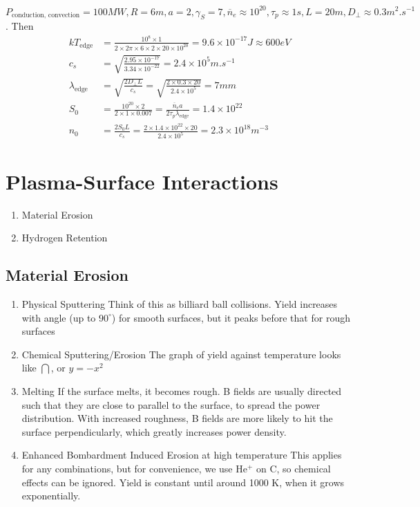 \documentclass[12pt]{article}
\begin{document}
\begin{ex}[ITER]
    $P_{\text{conduction, convection}} = 100\unit{MW}, R = 6\unit{m}, a = 2, \gamma_S = 7, \overline n_e \approx 10^{20}, \tau_p \approx 1\unit{s}, L = 20\unit{m}, D_\perp \approx 0.3 \unit{m^2.s^{-1}}$. Then
    \begin{align*}
        kT_{\text{edge}} &= \frac{10^8\times1}{2\times2\pi\times6\times2\times20\times10^{20}} = 9.6 \times 10^{-17}\unit{J} \approx 600 \unit{eV} \\
        c_s &= \sqrt{\frac{2.95\times10^{-17}}{3.34 \times 10^{-22}}} = 2.4 \times 10^5 \unit{m.s^{-1}} \\
        \lambda_{\text{edge}} &= \sqrt{\frac{2D_\perp L}{c_s}} = \sqrt{\frac{2\times0.3\times20}{2.4\times10^5}} = 7\unit{mm} \\
        S_0 &= \frac{10^{20}\times2}{2\times1\times0.007} = \frac{\overline n_ea}{2\tau_p\lambda_{\text{edge}}} = 1.4 \times 10^{22} \\
        n_0 &= \frac{2S_0L}{c_s} = \frac{2\times 1.4\times10^{22}\times20}{2.4\times10^5} = 2.3 \times 10^{18} \unit{m^{-3}}
    \end{align*}
\end{ex}

\section{Plasma-Surface Interactions}

\begin{enumerate}
    \item Material Erosion
    \item Hydrogen Retention
\end{enumerate}

\subsection{Material Erosion}

\begin{enumerate}
    \item Physical Sputtering
        Think of this as billiard ball collisions. Yield increases with angle (up to $90^\circ$) for smooth surfaces, but it peaks before that for rough surfaces
    \item Chemical Sputtering/Erosion
        The graph of yield against temperature looks like $\bigcap$, or $y=-x^2$
    \item Melting
        If the surface melts, it becomes rough. B fields are usually directed such that they are close to parallel to the surface, to spread the power distribution. With increased roughness, B fields are more likely to hit the surface perpendicularly, which greatly increases power density.
    \item Enhanced Bombardment Induced Erosion at high temperature
        This applies for any combinations, but for convenience, we use He$^+$ on C, so chemical effects can be ignored. Yield is constant until around 1000 K, when it grows exponentially.
\end{enumerate}
\end{document}
